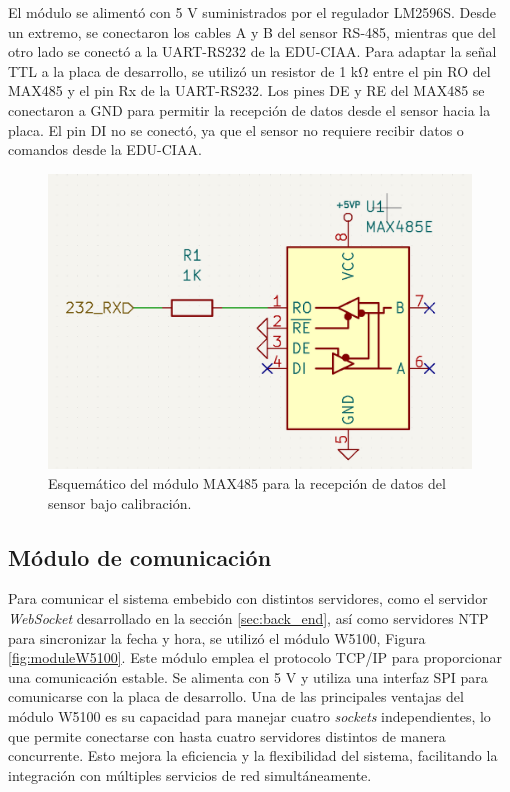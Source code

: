  El módulo se alimentó con 5 \unit{\volt} suministrados por el regulador LM2596S. Desde un extremo, se conectaron los cables A y B del sensor RS-485, mientras que del otro lado se conectó a la UART-RS232 de la EDU-CIAA. Para adaptar la señal TTL a la placa de desarrollo, se utilizó un resistor de 1 \unit{\kilo\ohm} entre el pin RO del MAX485 y el pin Rx de la UART-RS232. Los pines DE y RE del MAX485 se conectaron a GND para permitir la recepción de datos desde el sensor hacia la placa. El pin DI no se conectó, ya que el sensor no requiere recibir datos o comandos desde la EDU-CIAA.

\begin{figure}[H]
    \centering
    \includegraphics[width=0.45\linewidth]{Figuras/datalogger/Hardware/esquemRS485.png}
    \caption{Esquemático del módulo MAX485 para la recepción de datos del sensor bajo calibración.}
    \label{fig:esquemRS485}
\end{figure}
\subsection{Módulo de comunicación}\label{sec:moduloEthernet}

Para comunicar el sistema embebido con distintos servidores, como el servidor \textit{WebSocket} desarrollado en la sección \ref{sec:back_end}, así como servidores NTP para sincronizar la fecha y hora, se utilizó el módulo W5100, Figura \ref{fig:moduleW5100}. Este módulo emplea el protocolo TCP/IP para proporcionar una comunicación estable. Se alimenta con 5 \unit{\volt} y utiliza una interfaz SPI para comunicarse con la placa de desarrollo. Una de las principales ventajas del módulo W5100 \cite{W5100Datasheet} es su capacidad para manejar cuatro \textit{sockets} independientes, lo que permite conectarse con hasta cuatro servidores distintos de manera concurrente. Esto mejora la eficiencia y la flexibilidad del sistema, facilitando la integración con múltiples servicios de red simultáneamente.



